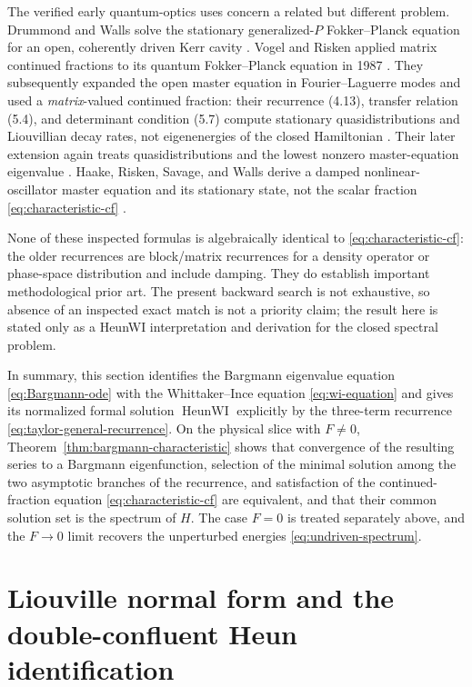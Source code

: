 \documentclass[11pt]{article}
\theoremstyle{remark}
\begin{document}
The verified early quantum-optics uses concern a related but different
problem.  Drummond and Walls solve the stationary generalized-\(P\)
Fokker--Planck equation for an open, coherently driven Kerr cavity
\cite{DrummondWalls1980Bistability}.  Vogel and Risken applied matrix
continued fractions to its quantum Fokker--Planck equation in 1987
\cite{VogelRisken1987Matrix}.  They subsequently expanded the open master
equation in Fourier--Laguerre modes and used a
\emph{matrix}-valued continued fraction: their recurrence (4.13), transfer
relation (5.4), and determinant condition (5.7) compute stationary
quasidistributions and Liouvillian decay rates, not eigenenergies of the
closed Hamiltonian \cite{VogelRisken1988Tunneling}.  Their later extension
again treats quasidistributions and the lowest nonzero master-equation
eigenvalue \cite{VogelRisken1989Quasiprobability}.  Haake, Risken, Savage,
and Walls derive a damped nonlinear-oscillator master equation and its
stationary state, not the scalar fraction \eqref{eq:characteristic-cf}
\cite{HaakeEtAl1986Master}.

None of these inspected formulas is algebraically identical to
\eqref{eq:characteristic-cf}: the older recurrences are block/matrix
recurrences for a density operator or phase-space distribution and include
damping.  They do establish important methodological prior art.  The present
backward search is not exhaustive, so absence of an inspected exact match is
not a priority claim; the result here is stated only as a HeunWI
interpretation and derivation for the closed spectral problem.

In summary, this section identifies the Bargmann eigenvalue equation
\eqref{eq:Bargmann-ode} with the Whittaker--Ince equation
\eqref{eq:wi-equation} and gives its normalized formal solution
\(\operatorname{HeunWI}\) explicitly by the three-term recurrence
\eqref{eq:taylor-general-recurrence}.  On the physical slice with
\(F\ne0\), Theorem~\ref{thm:bargmann-characteristic} shows that
convergence of the resulting series to a Bargmann eigenfunction,
selection of the minimal solution among the two asymptotic branches of
the recurrence, and satisfaction of the continued-fraction equation
\eqref{eq:characteristic-cf} are equivalent, and that their common
solution set is the spectrum of \(H\).  The case \(F=0\) is treated
separately above, and the \(F\to0\) limit recovers the unperturbed
energies \eqref{eq:undriven-spectrum}.

\section{Liouville normal form and the double-confluent Heun identification}
\label{sec:liouville}
\end{document}
